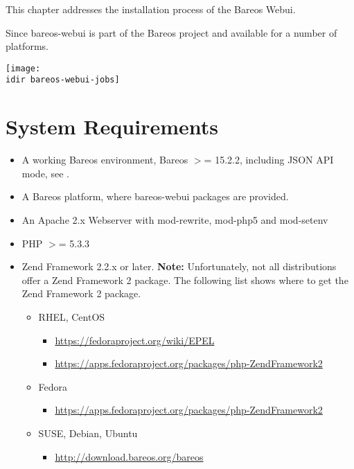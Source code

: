 
This chapter addresses the installation process of the Bareos Webui.

Since  bareos-webui is part of the Bareos project and available for a number of platforms.

\begin{center}
  \texttt{[image: \\idir bareos-webui-jobs]}
\end{center}


\section{System Requirements}

\begin{itemize}
\item A working Bareos environment, Bareos $>$= 15.2.2, including JSON API mode, see .
\item A Bareos platform, where bareos-webui packages are provided.
\item An Apache 2.x Webserver with mod-rewrite, mod-php5 and mod-setenv
\item PHP $>$= 5.3.3
\item Zend Framework 2.2.x or later.
  \textbf{Note:} Unfortunately, not all distributions offer a Zend Framework 2 package.
  The following list shows where to get the Zend Framework 2 package.
  \begin{itemize}
  \item RHEL, CentOS
    \begin{itemize}
    \item \url{https://fedoraproject.org/wiki/EPEL}
    \item \url{https://apps.fedoraproject.org/packages/php-ZendFramework2}
    \end{itemize}

  \item Fedora
    \begin{itemize}
    \item \url{https://apps.fedoraproject.org/packages/php-ZendFramework2}
    \end{itemize}

  \item SUSE, Debian, Ubuntu
    \begin{itemize}
    \item \url{http://download.bareos.org/bareos}
    \end{itemize}
  \end{itemize}
\end{itemize}

